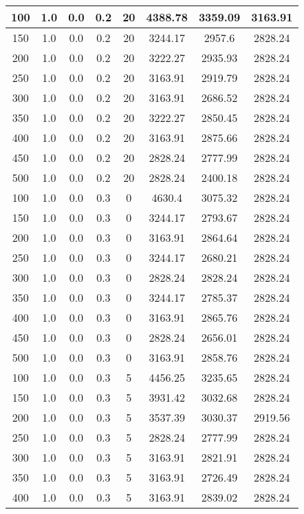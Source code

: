 \documentclass[a4paper, 12pt]{extreport}
\begin{document}
\begin{itemize}
\begin{longtable}{|c|c|c|c|c|c|c|c|}
			100 & 1.0 & 0.0 & 0.2 & 20 & 4388.78 & 3359.09 & 3163.91 \\\hline
			150 & 1.0 & 0.0 & 0.2 & 20 & 3244.17 & 2957.6 & 2828.24 \\\hline
			200 & 1.0 & 0.0 & 0.2 & 20 & 3222.27 & 2935.93 & 2828.24 \\\hline
			250 & 1.0 & 0.0 & 0.2 & 20 & 3163.91 & 2919.79 & 2828.24 \\\hline
			300 & 1.0 & 0.0 & 0.2 & 20 & 3163.91 & 2686.52 & 2828.24 \\\hline
			350 & 1.0 & 0.0 & 0.2 & 20 & 3222.27 & 2850.45 & 2828.24 \\\hline
			400 & 1.0 & 0.0 & 0.2 & 20 & 3163.91 & 2875.66 & 2828.24 \\\hline
			450 & 1.0 & 0.0 & 0.2 & 20 & 2828.24 & 2777.99 & 2828.24 \\\hline
			500 & 1.0 & 0.0 & 0.2 & 20 & 2828.24 & 2400.18 & 2828.24 \\\hline
			100 & 1.0 & 0.0 & 0.3 & 0 & 4630.4 & 3075.32 & 2828.24 \\\hline
			150 & 1.0 & 0.0 & 0.3 & 0 & 3244.17 & 2793.67 & 2828.24 \\\hline
			200 & 1.0 & 0.0 & 0.3 & 0 & 3163.91 & 2864.64 & 2828.24 \\\hline
			250 & 1.0 & 0.0 & 0.3 & 0 & 3244.17 & 2680.21 & 2828.24 \\\hline
			300 & 1.0 & 0.0 & 0.3 & 0 & 2828.24 & 2828.24 & 2828.24 \\\hline
			350 & 1.0 & 0.0 & 0.3 & 0 & 3244.17 & 2785.37 & 2828.24 \\\hline
			400 & 1.0 & 0.0 & 0.3 & 0 & 3163.91 & 2865.76 & 2828.24 \\\hline
			450 & 1.0 & 0.0 & 0.3 & 0 & 2828.24 & 2656.01 & 2828.24 \\\hline
			500 & 1.0 & 0.0 & 0.3 & 0 & 3163.91 & 2858.76 & 2828.24 \\\hline
			100 & 1.0 & 0.0 & 0.3 & 5 & 4456.25 & 3235.65 & 2828.24 \\\hline
			150 & 1.0 & 0.0 & 0.3 & 5 & 3931.42 & 3032.68 & 2828.24 \\\hline
			200 & 1.0 & 0.0 & 0.3 & 5 & 3537.39 & 3030.37 & 2919.56 \\\hline
			250 & 1.0 & 0.0 & 0.3 & 5 & 2828.24 & 2777.99 & 2828.24 \\\hline
			300 & 1.0 & 0.0 & 0.3 & 5 & 3163.91 & 2821.91 & 2828.24 \\\hline
			350 & 1.0 & 0.0 & 0.3 & 5 & 3163.91 & 2726.49 & 2828.24 \\\hline
			400 & 1.0 & 0.0 & 0.3 & 5 & 3163.91 & 2839.02 & 2828.24 \\\hline

\end{longtable}
\end{itemize}
\end{document}
